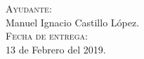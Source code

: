 \documentclass[answers]{exam}
\begin{document}
\begin{titlepage}
\begin{center}
{\huge \scshape Ayudante:}\\
\vspace{5mm} %
{\huge Manuel Ignacio Castillo López.}\\ [1cm]

{\huge \scshape Fecha de entrega:}\\
\vspace{5mm} %
{\huge 13 de Febrero del 2019.}\\[1cm]

\vfill %

\end{center}
\end{titlepage}

\begin{questions}



\end{questions}
\end{document}
